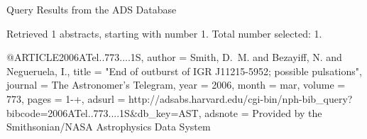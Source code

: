 Query Results from the ADS Database


Retrieved 1 abstracts, starting with number 1.  Total number selected: 1.

@ARTICLE{2006ATel..773....1S,
   author = {{Smith}, D.~M. and {Bezayiff}, N. and {Negueruela}, I.},
    title = "{End of outburst of IGR J11215-5952; possible pulsations}",
  journal = {The Astronomer's Telegram},
     year = 2006,
    month = mar,
   volume = 773,
    pages = {1-+},
   adsurl = {http://adsabs.harvard.edu/cgi-bin/nph-bib_query?bibcode=2006ATel..773....1S&db_key=AST},
  adsnote = {Provided by the Smithsonian/NASA Astrophysics Data System}
}


